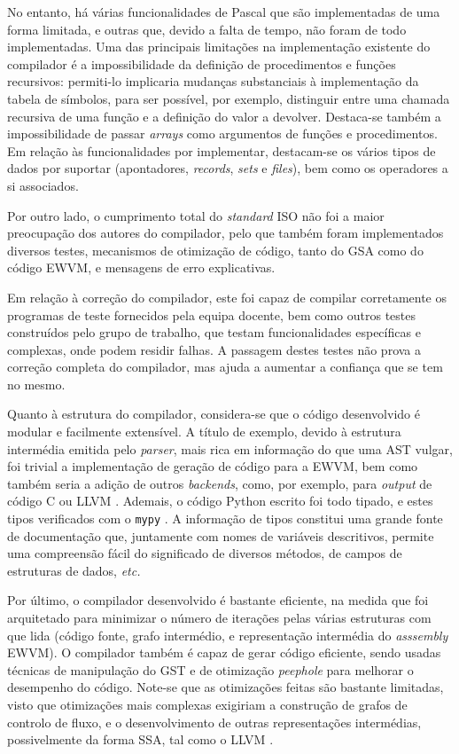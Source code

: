 \documentclass[12pt, a4paper]{article}
\begin{document}
No entanto, há várias funcionalidades de Pascal que são implementadas de uma forma limitada, e
outras que, devido a falta de tempo, não foram de todo implementadas. Uma das principais limitações
na implementação existente do compilador é a impossibilidade da definição de procedimentos e funções
recursivos: permiti-lo implicaria mudanças substanciais à implementação da tabela de símbolos, para
ser possível, por exemplo, distinguir entre uma chamada recursiva de uma função e a definição do
valor a devolver. Destaca-se também a impossibilidade de passar \emph{arrays} como argumentos de
funções e procedimentos. Em relação às funcionalidades por implementar, destacam-se os vários tipos
de dados por suportar (apontadores, \emph{records}, \emph{sets} e \emph{files}), bem como os
operadores a si associados.

Por outro lado, o cumprimento total do \emph{standard} ISO não foi a maior preocupação dos autores
do compilador, pelo que também foram implementados diversos testes, mecanismos de otimização de
código, tanto do GSA como do código EWVM, e mensagens de erro explicativas.

Em relação à correção do compilador, este foi capaz de compilar corretamente os programas de teste
fornecidos pela equipa docente, bem como outros testes construídos pelo grupo de trabalho, que
testam funcionalidades específicas e complexas, onde podem residir falhas. A passagem destes testes
não prova a correção completa do compilador, mas ajuda a aumentar a confiança que se tem no mesmo.

Quanto à estrutura do compilador, considera-se que o código desenvolvido é modular e facilmente
extensível. A título de exemplo, devido à estrutura intermédia emitida pelo \emph{parser}, mais rica
em informação do que uma AST vulgar, foi trivial a implementação de geração de código para a EWVM,
bem como também seria a adição de outros \emph{backends}, como, por exemplo, para \emph{output} de
código C \cite{c} ou LLVM \cite{llvm}. Ademais, o código Python escrito foi todo tipado, e estes
tipos verificados com o \texttt{mypy} \cite{mypy}. A informação de tipos constitui uma grande fonte
de documentação que, juntamente com nomes de variáveis descritivos, permite uma compreensão fácil
do significado de diversos métodos, de campos de estruturas de dados, \emph{etc.}

Por último, o compilador desenvolvido é bastante eficiente, na medida que foi arquitetado para
minimizar o número de iterações pelas várias estruturas com que lida (código fonte, grafo
intermédio, e representação intermédia do \emph{asssembly} EWVM). O compilador também é capaz de
gerar código eficiente, sendo usadas técnicas de manipulação do GST e de otimização \emph{peephole}
para melhorar o desempenho do código. Note-se que as otimizações feitas são bastante limitadas,
visto que otimizações mais complexas exigiriam a construção de grafos de controlo de fluxo, e o
desenvolvimento de outras representações intermédias, possivelmente da forma SSA, tal como o LLVM
\cite{llvm}.
\end{document}
